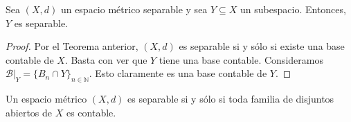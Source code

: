 \begin{corollary}
	Sea $(X, d)$ un espacio métrico separable y sea $Y \subseteq X$ un subespacio. Entonces, $Y$ es separable.
\end{corollary}

\begin{proof}
	Por el Teorema anterior, $(X, d)$ es separable si y sólo si existe una base contable de $X$. Basta con ver que $Y$ tiene una base contable. Consideramos $\mathcal{B}|_Y = \{ B_n \cap Y\}_{n \in \mathbb{N}}$. Esto claramente es una base contable de $Y$.
\end{proof}

\begin{proposition}
	Un espacio métrico $(X, d)$ es separable si y sólo si toda familia de disjuntos abiertos de $X$ es contable.
\end{proposition}

